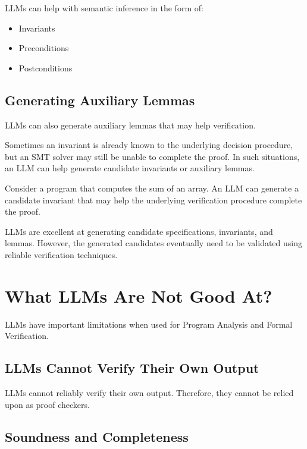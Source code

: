 LLMs can help with semantic inference in the form of:

\begin{itemize}
    \item Invariants
    \item Preconditions
    \item Postconditions
\end{itemize}

\subsection{Generating Auxiliary Lemmas}

LLMs can also generate auxiliary lemmas that may help verification.

Sometimes an invariant is already known to the underlying decision
procedure, but an SMT solver may still be unable to complete the proof.
In such situations, an LLM can help generate candidate invariants or
auxiliary lemmas.

\begin{ppexample}
Consider a program that computes the sum of an array. An LLM can
generate a candidate invariant that may help the underlying verification
procedure complete the proof.
\end{ppexample}

\begin{ppnote}
LLMs are excellent at generating candidate specifications, invariants,
and lemmas. However, the generated candidates eventually need to be
validated using reliable verification techniques.
\end{ppnote}


\section{What LLMs Are Not Good At?}

LLMs have important limitations when used for Program Analysis and
Formal Verification.

\subsection{LLMs Cannot Verify Their Own Output}

LLMs cannot reliably verify their own output. Therefore, they cannot
be relied upon as proof checkers.

\subsection{Soundness and Completeness}

